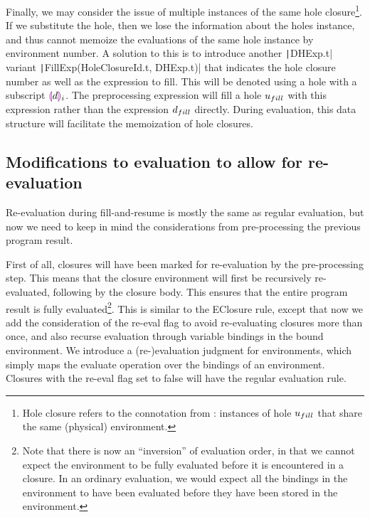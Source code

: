 Finally, we may consider the issue of multiple instances of the same hole closure\footnote{Hole closure refers to the connotation from : instances of hole $u_{fill}$ that share the same (physical) environment.}. If we substitute the hole, then we lose the information about the holes instance, and thus cannot memoize the evaluations of the same hole instance by environment number. A solution to this is to introduce another \texttt|DHExp.t| variant \texttt|FillExp(HoleClosureId.t, DHExp.t)| that indicates the hole closure number as well as the expression to fill. This will be denoted using a hole with a subscript $\textcolor{violet}{\llparenthesis} d\textcolor{violet}{\rrparenthesis}_i$. The preprocessing expression will fill a hole $u_{fill}$ with this expression rather than the expression $d_{fill}$ directly. During evaluation, this data structure will facilitate the memoization of hole closures.

\subsection{Modifications to evaluation to allow for re-evaluation}
\label{sec:re-eval}

Re-evaluation during fill-and-resume is mostly the same as regular evaluation, but now we need to keep in mind the considerations from pre-processing the previous program result.

First of all, closures will have been marked for re-evaluation by the pre-processing step. This means that the closure environment will first be recursively re-evaluated, following by the closure body. This ensures that the entire program result is fully evaluated\footnote{Note that there is now an ``inversion'' of evaluation order, in that we cannot expect the environment to be fully evaluated before it is encountered in a closure. In an ordinary evaluation, we would expect all the bindings in the environment to have been evaluated before they have been stored in the environment.}. This is similar to the EClosure rule, except that now we add the consideration of the re-eval flag to avoid re-evaluating closures more than once, and also recurse evaluation through variable bindings in the bound environment. We introduce a (re-)evaluation judgment for environments, which simply maps the evaluate operation over the bindings of an environment. Closures with the re-eval flag set to false will have the regular evaluation rule.

\begin{singlespace}
\end{singlespace}

